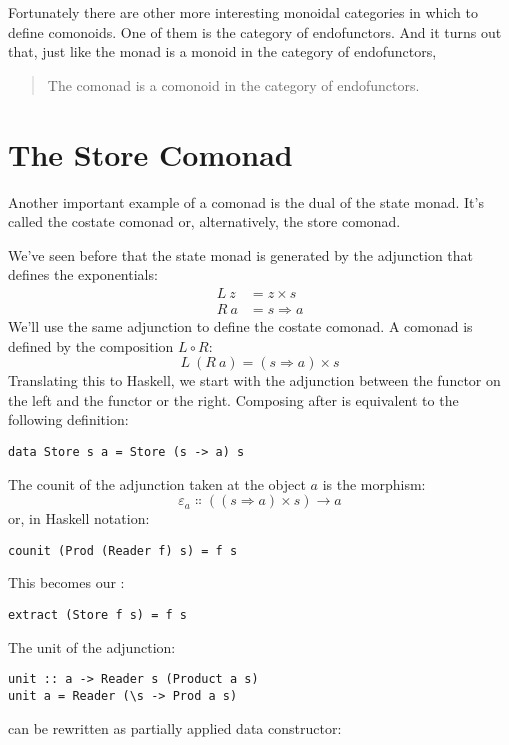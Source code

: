Fortunately there are other more interesting monoidal categories in
which to define comonoids. One of them is the category of endofunctors.
And it turns out that, just like the monad is a monoid in the category
of endofunctors,

\begin{quote}
The comonad is a comonoid in the category of endofunctors.
\end{quote}

\section{The Store Comonad}

Another important example of a comonad is the dual of the state monad.
It's called the costate comonad or, alternatively, the store comonad.

We've seen before that the state monad is generated by the adjunction
that defines the exponentials:
\begin{align*}
L\ z &= z\times{}s \\
R\ a &= s \Rightarrow a
\end{align*}
We'll use the same adjunction to define the costate comonad. A comonad
is defined by the composition $L \circ R$:
\[L\ (R\ a) = (s \Rightarrow a)\times{}s\]
Translating this to Haskell, we start with the adjunction between the
 functor on the left and the  functor or the
right. Composing  after  is equivalent to
the following definition:

\begin{Verbatim}
data Store s a = Store (s -> a) s
\end{Verbatim}
The counit of the adjunction taken at the object $a$ is the
morphism:
\[\varepsilon_a \Colon ((s \Rightarrow a)\times{}s) \to a\]
or, in Haskell notation:

\begin{Verbatim}
counit (Prod (Reader f) s) = f s
\end{Verbatim}
This becomes our :

\begin{Verbatim}
extract (Store f s) = f s
\end{Verbatim}
The unit of the adjunction:

\begin{Verbatim}
unit :: a -> Reader s (Product a s)
unit a = Reader (\s -> Prod a s)
\end{Verbatim}
can be rewritten as partially applied data constructor:

